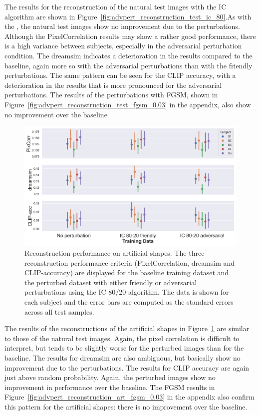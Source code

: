 The results for the reconstruction of the natural test images with the IC algorithm are shown in Figure~\ref{fig:advpert_reconstruction_test_ic_80}.As with the , the natural test images show no improvement due to the perturbations. Although the PixelCorrelation results may show a rather good performance, there is a high variance between subjects, especially in the adversarial perturbation condition. The dreamsim indicates a deterioration in the results compared to the baseline, again more so with the adversarial perturbations than with the friendly perturbations. The same pattern can be seen for the CLIP accuracy, with a deterioration in the results that is more pronounced for the adversarial perturbations. The results of the perturbations with FGSM, shown in Figure~\ref{fig:advpert_reconstruction_test_fgsm_0.03} in the appendix, also show no improvement over the baseline. 

\begin{figure}[ht]
    \centering
    \includegraphics[width=1\textwidth]{plots/advpert_reconstruction_art_ic_80-20.png}
    \caption[Experiment 3: Reconstruction performance on artificial shapes]{Reconstruction performance on artificial shapes. The three reconstruction performance criteria (PixelCorrelation, dreamsim and CLIP-accuracy) are displayed for the baseline training dataset and the perturbed dataset with either friendly or adversarial perturbations using the IC 80/20 algorithm. The data is shown for each subject and the error bars are computed as the standard errors across all test samples.}\label{fig:advpert_reconstruction_art_ic_80}
\end{figure}

The results of the reconstructions of the artificial shapes in Figure~\ref{fig:advpert_reconstruction_art_ic_80} are similar to those of the natural test images. Again, the pixel correlation is difficult to interpret, but tends to be slightly worse for the perturbed images than for the baseline. The results for dreamsim are also ambiguous, but basically show no improvement due to the perturbations. The results for CLIP accuracy are again just above random probability. Again, the perturbed images show no improvement in performance over the baseline. The FGSM results in Figure~\ref{fig:advpert_reconstruction_art_fgsm_0.03} in the appendix also confirm this pattern for the artificial shapes: there is no improvement over the baseline. 

